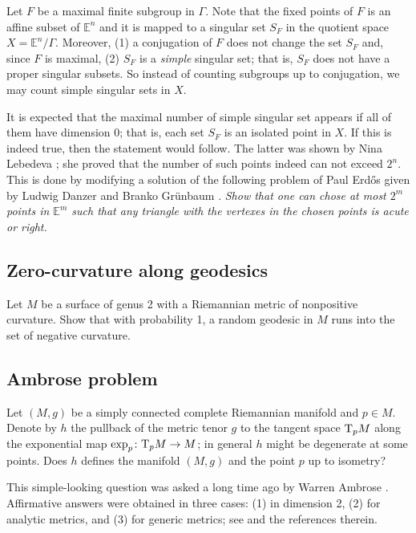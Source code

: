 Let $F$ be a maximal finite subgroup in $\Gamma$.
Note that the fixed points of $F$ is an affine subset of $\mathbb{E}^n$ and it is mapped to a singular set $S_F$ in the quotient space $X=\mathbb{E}^n/\Gamma$.
Moreover, (1) a conjugation of $F$ does not change the set $S_F$ and, since $F$ is maximal, (2) $S_F$ is a \emph{simple} singular set;
that is, $S_F$ does not have a proper singular subsets.
So instead of counting subgroups up to conjugation, we may count simple singular sets in $X$.

It is expected that the maximal number of simple singular set appears if all of them have dimension 0;
that is, each set $S_F$ is an isolated point in $X$.
If this is indeed true, then the statement would follow.
The latter was shown by  Nina Lebedeva \cite{lebedeva};
she proved that the number of such points indeed can not exceed $2^n$.
This is done by modifying a solution of the following problem of Paul Erdős given by Ludwig Danzer and Branko Gr{\"u}nbaum \cite{danzer-guenbaum}.
\emph{Show that one can chose at most $2^m$ points in $\mathbb{E}^m$ such that any triangle with the vertexes in the chosen points is acute or right.}



\subsection*{Zero-curvature along geodesics}

\begin{pr}
Let $M$ be a surface of genus 2 with a Riemannian metric of nonpositive curvature.
Show that with probability 1, a random geodesic in $M$ runs into the set of negative curvature.
\end{pr}

\subsection*{Ambrose problem}

\begin{pr}
Let $(M,g)$ be a simply connected complete Riemannian manifold and $p\in M$.
Denote by $h$ the pullback of the metric tenor $g$ to the tangent space $\mathrm{T}_pM$ along the exponential map $\exp_p\:\T_pM\z\to M$;
in general $h$ might be degenerate at some points.
Does $h$ defines the manifold $(M,g)$ and the point $p$ up to isometry? 
\end{pr}

This simple-looking question was asked a long time ago by Warren Ambrose \cite{ambrose}.
Affirmative answers were obtained in three cases: (1) in dimension 2, (2) for analytic metrics, and (3) for generic metrics; see \cite{hebla, itoh, ardoy} and the references therein.




